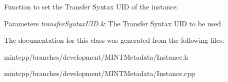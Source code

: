 Function to set the Transfer Syntax UID of the instance. 


\begin{DoxyParams}{Parameters}
{\em transferSyntaxUID} & The Transfer Syntax UID to be used \\
\hline
\end{DoxyParams}


The documentation for this class was generated from the following files:\begin{DoxyCompactItemize}
\item 
mintcpp/branches/development/MINTMetadata/Instance.h\item 
mintcpp/branches/development/MINTMetadata/Instance.cpp\end{DoxyCompactItemize}
